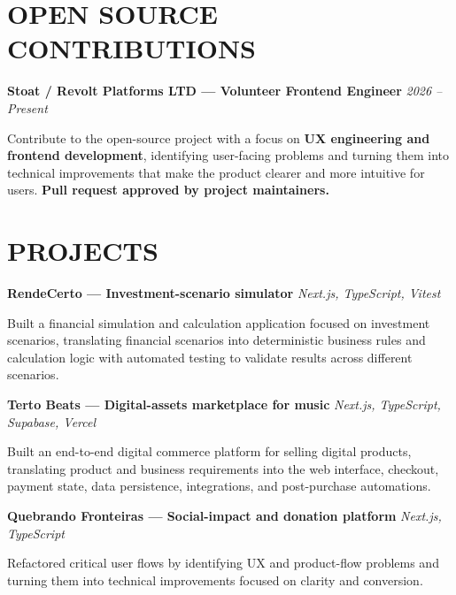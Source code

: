 \documentclass[10pt,a4paper]{article}
\begin{document}
\section*{OPEN SOURCE CONTRIBUTIONS}

\noindent
\textbf{Stoat / Revolt Platforms LTD — Volunteer Frontend Engineer}
\hfill
\textit{2026 -- Present}

\footnotesize

Contribute to the open-source project with a focus on
\textbf{UX engineering and frontend development}, identifying
user-facing problems and turning them into technical improvements
that make the product clearer and more intuitive for users.
\textbf{Pull request approved by project maintainers.}


\section*{PROJECTS}

\noindent
\textbf{RendeCerto — Investment-scenario simulator}
\hfill
\textit{Next.js, TypeScript, Vitest}

\footnotesize

Built a financial simulation and calculation application focused on
investment scenarios, translating financial scenarios into
deterministic business rules and calculation logic with automated
testing to validate results across different scenarios.

\vspace{0.5pt}

\noindent
\textbf{Terto Beats — Digital-assets marketplace for music}
\hfill
\textit{Next.js, TypeScript, Supabase, Vercel}

\footnotesize

Built an end-to-end digital commerce platform for selling digital
products, translating product and business requirements into the
web interface, checkout, payment state, data persistence,
integrations, and post-purchase automations.

\vspace{0.5pt}

\noindent
\textbf{Quebrando Fronteiras — Social-impact and donation platform}
\hfill
\textit{Next.js, TypeScript}

\footnotesize

Refactored critical user flows by identifying UX and product-flow
problems and turning them into technical improvements focused on
clarity and conversion.
\end{document}
